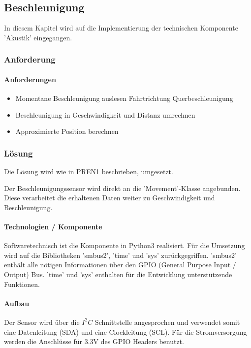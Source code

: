\documentclass[../../main.tex]{subfiles}
\begin{document}
\subsection{Beschleunigung}
In diesem Kapitel wird auf die Implementierung der technischen Komponente 'Akustik' eingegangen.
\subsubsection{Anforderung}

\paragraph{Anforderungen}
\begin{itemize}
    \item Momentane Beschleunigung auslesen
      \subitem Fahrtrichtung
      \subitem Querbeschleunigung
    \item Beschleunigung in Geschwindigkeit und Distanz umrechnen
    \item Approximierte Position berechnen
\end{itemize}

\subsubsection{Lösung}
Die Lösung wird wie in PREN1 beschrieben, umgesetzt.

Der Beschleunigungssensor wird direkt an die 'Movement'-Klasse angebunden. Diese verarbeitet die erhaltenen Daten weiter zu Geschwindigkeit und Beschleunigung.

\paragraph{Technologien / Komponente}
Softwaretechnisch ist die Komponente in Python3 realisiert. Für die Umsetzung wird auf die Bibliotheken 'smbus2', 'time' und 'sys' zurückgegriffen. 'smbus2' enthält alle nötigen Informationen über den GPIO (General Purpose Input / Output) Bus. 'time' und 'sys' enthalten für die Entwicklung unterstützende Funktionen. 

\paragraph{Aufbau}
Der Sensor wird über die $I^2C$ Schnittstelle angesprochen und verwendet somit eine Datenleitung (SDA) und eine Clockleitung (SCL). Für die Stromversorgung werden die Anschlüsse für 3.3V des GPIO Headers benutzt.
\end{document}

